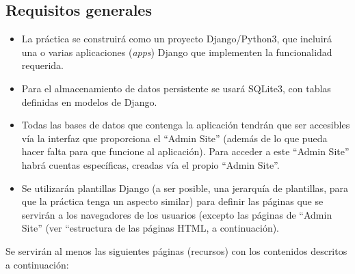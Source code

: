 \subsection{Requisitos generales}

\begin{itemize}

\item La práctica se construirá como un proyecto Django/Python3, que incluirá una o varias aplicaciones (\emph{apps}) Django que implementen la funcionalidad requerida.

\item Para el almacenamiento de datos persistente se usará SQLite3, con tablas definidas en modelos de Django.

\item Todas las bases de datos que contenga la aplicación tendrán que ser accesibles vía la interfaz que proporciona el ``Admin Site'' (además de lo que pueda hacer falta para que funcione al aplicación). Para acceder a este ``Admin Site'' habrá cuentas específicas, creadas vía el propio ``Admin Site''.

\item Se utilizarán plantillas Django (a ser posible, una jerarquía de plantillas, para que la práctica tenga un aspecto similar) para definir las páginas que se servirán a los navegadores de los usuarios (excepto las páginas de ``Admin Site'' (ver ``estructura de las páginas HTML, a continuación).

\end{itemize}

Se servirán al menos las siguientes páginas (recursos) con los contenidos descritos a continuación:

